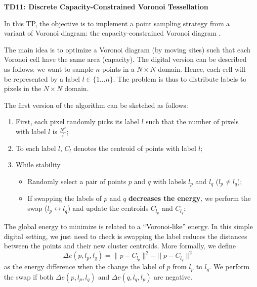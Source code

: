 \documentclass[a4paper, 11pt]{article}
\title{}
\author{}
\date{}
\begin{document}
\begin{center}
	\LARGE \textbf{TD11: Discrete Capacity-Constrained Voronoi Tessellation}
\end{center}

\bigskip
\par In this TP, the objective is to implement a point sampling
strategy from a variant of Voronoi diagram: the capacity-constrained
Voronoi diagram
\cite{BalzerHeck:2008:CCVDIFS,Balzer.etal:2009:CCPDAVoLM}.

The main idea is to optimize a Voronoi diagram (by moving sites) such
that each Voronoi cell have the same area (capacity).  The digital
version can be described as follows: we want to sample $n$ points in a
$N\times N$ domain. Hence, each cell will be represented by a label
$l\in\{1\ldots n\}$. The problem is thus to distribute labels to
pixels in the $N\times N$ domain.

The first version of the algorithm can be sketched as follows:

\begin{enumerate}
\item First, each pixel randomly picks its label $l$ such that the
  number of pixels with label $l$ is  $\frac{N^2}{l}$;
\item To each label $l$, $C_l$ denotes the centroid of points with
  label $l$;

\item While stability
  \begin{itemize}
  \item Randomly select a pair of points $p$ and $q$ with
    labels $l_p$ and $l_q$ ($l_p\neq l_q$);
  \item If swapping the labels of $p$ and $q$ \textbf{decreases the
    energy}, we perform the swap  ($l_p\leftrightarrow l_q$) and
    update the centroids $C_{l_p}$ and $C_{l_q}$;
  \end{itemize}
\end{enumerate}

The global energy to minimize is related to a ``Voronoi-like''
energy. In this simple digital setting, we just need to check is
swapping the label reduces the distances between the points and their
new cluster centroids.
More formally, we define
\begin{displaymath}
  \Delta e(p,l_p,l_q) = \|p-C_{l_p}\|^2 - \|p-C_{l_q}\|^2
\end{displaymath}
as the energy difference when the change the label of $p$ from $l_p$
to $l_q$. We perform the swap if both $\Delta e(p,l_p,l_q)$ and $\Delta
e(q,l_q,l_p)$ are negative.
\end{document}
